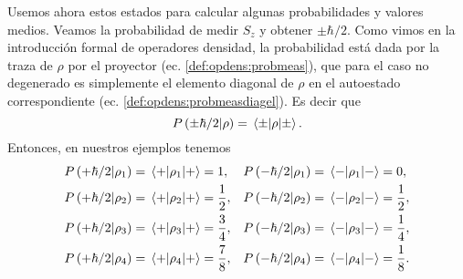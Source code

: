 \documentclass[10pt, a4paper]{article}
\numberwithin{equation}{subsection}
\begin{document}
Usemos ahora estos estados para calcular algunas probabilidades y valores
medios. Veamos la probabilidad de medir $S_z$ y obtener $\pm\hbar/2$. Como
vimos en la introducción formal de operadores densidad, la probabilidad está
dada por la traza de $\rho$ por el proyector (ec. \eqref{def:opdens:probmeas}),
que para el caso no degenerado es simplemente el elemento diagonal de $\rho$ en
el autoestado correspondiente (ec. \eqref{def:opdens:probmeasdiagel}). Es decir
que
\begin{equation}
  \ProbCond{\pm\hbar/2}{\rho} = \matrixel{\pm}{\rho}{\pm}.
\end{equation}
Entonces, en nuestros ejemplos tenemos
\begin{align}
  \ProbCond{+\hbar/2}{\rho_1} &= \matrixel{+}{\rho_1}{+} = 1, &
  \ProbCond{-\hbar/2}{\rho_1} &= \matrixel{-}{\rho_1}{-} = 0, \\
  \ProbCond{+\hbar/2}{\rho_2} &= \matrixel{+}{\rho_2}{+} = \frac{1}{2}, &
  \ProbCond{-\hbar/2}{\rho_2} &= \matrixel{-}{\rho_2}{-} = \frac{1}{2}, \\
  \ProbCond{+\hbar/2}{\rho_3} &= \matrixel{+}{\rho_3}{+} = \frac{3}{4}, &
  \ProbCond{-\hbar/2}{\rho_3} &= \matrixel{-}{\rho_3}{-} = \frac{1}{4}, \\
  \ProbCond{+\hbar/2}{\rho_4} &= \matrixel{+}{\rho_4}{+} = \frac{7}{8}, &
  \ProbCond{-\hbar/2}{\rho_4} &= \matrixel{-}{\rho_4}{-} = \frac{1}{8}.
\end{align}
\end{document}
